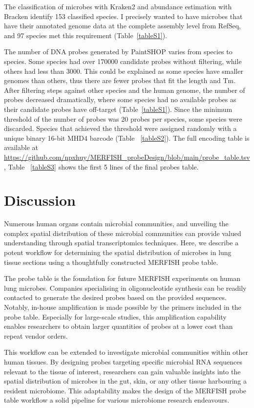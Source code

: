 \documentclass[10pt,letterpaper]{article}
\begin{document}
\noindent The classification of microbes with Kraken2 and abundance estimation with Bracken identify  153 classified species. I precisely wanted to have microbes that have their annotated genome data at the complete assembly level from RefSeq, and 97 species met this requirement (Table~\ref{tableS1}).

\noindent The number of DNA probes generated by PaintSHOP varies from species to species. Some species had over 170000 candidate probes without filtering, while others had less than 3000. This could be explained as some species have smaller genomes than others, thus there are fewer probes that fit the length and Tm. After filtering steps against other species and the human genome, the number of probes decreased dramatically, where some species had no available probes as their candidate probes have off-target (Table~\ref{tableS1}). Since the minimum threshold of the number of probes was 20 probes per species, some species were discarded. Species that achieved the threshold were assigned randomly with a unique binary 16-bit MHD4 barcode (Table ~\ref{tableS2}). The full encoding table is available at \url{https://github.com/npxhuy/MERFISH_probeDesign/blob/main/probe_table.tsv}, Table ~\ref{tableS3} shows the first 5 lines of the final probes table.

\section*{Discussion}
Numerous human organs contain microbial communities, and unveiling the complex spatial distribution of these microbial communities can provide valued understanding through spatial transcriptomics techniques. Here, we describe a potent workflow for determining the spatial distribution of microbes in lung tissue sections using a thoughtfully constructed MERFISH probe table.

\noindent The probe table is the foundation for future MERFISH experiments on human lung microbes. Companies specialising in oligonucleotide synthesis can be readily contacted to generate the desired probes based on the provided sequences. Notably, in-house amplification is made possible by the primers included in the probe table. Especially for large-scale studies, this amplification capability enables researchers to obtain larger quantities of probes at a lower cost than repeat vendor orders.

\noindent This workflow can be extended to investigate microbial communities within other human tissues. By designing probes targeting specific microbial RNA sequences relevant to the tissue of interest, researchers can gain valuable insights into the spatial distribution of microbes in the gut, skin, or any other tissue harbouring a resident microbiome. This adaptability makes the design of the MERFISH probe table workflow a solid pipeline for various microbiome research endeavours.
\end{document}
